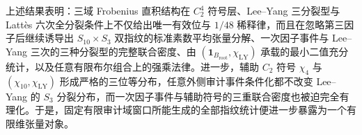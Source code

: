 


\noindent
上述结果表明：三域 Frobenius 直积结构在 \(C_2^4\) 符号层、Lee--Yang 三分裂型与 Latt\`es 六次全分裂条件上不仅给出唯一有效位与 \(1/48\) 稀释律，而且在忽略第三因子后继续诱导出 \(S_{10}\times S_3\) 双指纹的标准素数平均张量分解、一次因子事件与 Lee--Yang 三次的三种分裂型的完整联合密度、由 \((\mathbf 1_{B_{\mathrm{root}}},\chi_{\mathrm{LY}})\) 承载的最小二值充分统计，以及任意有限布尔组合上的强乘法律。进一步，辅助 \(C_2\) 符号 \(\chi_4\) 与 \((\chi_{10},\chi_{\mathrm{LY}})\) 形成严格的三位等分布，任意外侧审计事件条件化都不改变 Lee--Yang 的 \(S_3\) 分裂分布，而一次因子事件与辅助符号的三重联合密度也被迫完全有理化。于是，固定有限审计域窗口所能生成的全部指纹统计便进一步暴露为一个有限维张量对象。

\endinput

